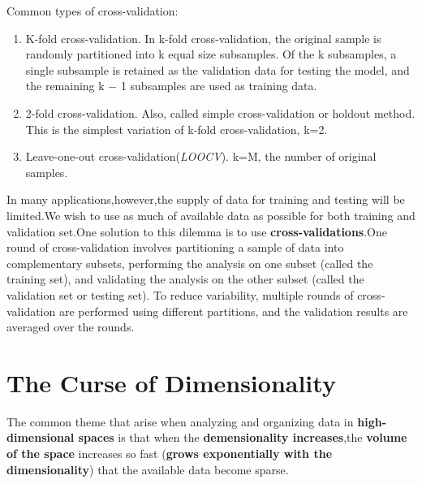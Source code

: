 Common types of cross-validation:
\begin{enumerate}
	\item K-fold cross-validation. In k-fold cross-validation, the original sample is randomly partitioned into k equal size subsamples. Of the k subsamples, a single subsample is retained as the validation data for testing the model, and the remaining k − 1 subsamples are used as training data.
	\item 2-fold cross-validation. Also, called simple cross-validation or holdout method. This is the simplest variation of k-fold cross-validation, k=2.
	\item Leave-one-out cross-validation(\emph{LOOCV}). k=M, the number of original samples.
\end{enumerate}
In many applications,however,the supply of data for training and testing will be limited.We wish to use as much of available data as possible for both training and validation set.One solution to this dilemma is to use \textbf{cross-validations}.One round of cross-validation involves partitioning a sample of data into complementary subsets, performing the analysis on one subset (called the training set), and validating the analysis on the other subset (called the validation set or testing set). To reduce variability, multiple rounds of cross-validation are performed using different partitions, and the validation results are averaged over the rounds.


\section{The Curse of Dimensionality}
The common theme that arise when analyzing and organizing data in \textbf{high-dimensional spaces} is that when the \textbf{demensionality increases},the \textbf{volume of the space} increases so fast (\textbf{grows exponentially with the dimensionality}) that the available data become sparse.

